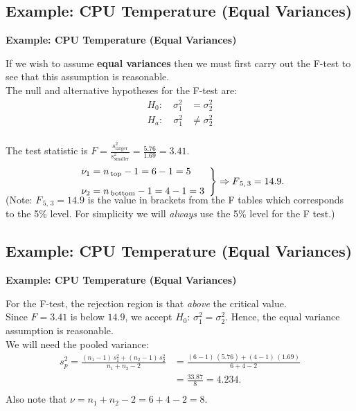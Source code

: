 \documentclass[compress]{beamer}        %
\makeatletter
\newcommand{\tcb}{\textcolor{beamer@blendedblue}}
\makeatother
\begin{document}
\subsection{Example: CPU Temperature (Equal Variances)}
\begin{frame}{\bf \tcb{Example: CPU Temperature (Equal Variances)}}

If we wish to assume {\bf equal variances} then we must first carry out the F-test to see that this assumption is reasonable.\\[0.4cm]

The null and alternative hypotheses for the F-test are:
\begin{align*}
H_0:\quad \sigma_1^2 &= \sigma_2^2 \\[0.2cm]
H_a:\quad \sigma_1^2 &\ne \sigma_2^2 \\[-0.4cm]
\end{align*}

The test statistic is $F = \frac{s_{\text{larger}}^2}{s_{\text{smaller}}^2} = \frac{5.76}{1.69} = 3.41$.\\[-0.1cm]
\begin{align*}\left.
\begin{array}{l}
\nu_1 = n_{\text{\,top}}-1 = 6-1=5 \\[0.3cm]
\nu_2 = n_{\text{\,bottom}}-1 = 4-1=3
\end{array}\right\} \Rightarrow F_{\,5,\,3}=14.9.\\[-0.4cm]
\end{align*}
{\footnotesize(Note: $F_{\,5,\,3}=14.9$ is the value in brackets from the F tables which corresponds to the 5\% level. For simplicity we will \emph{always} use the 5\% level for the F test.)}

\end{frame}




\subsection{Example: CPU Temperature (Equal Variances)}
\begin{frame}{\bf \tcb{Example: CPU Temperature (Equal Variances)}}

For the F-test, the rejection region is that \emph{above} the critical value.\\[0.4cm]

Since $F=3.41$ is below $14.9$, we accept $H_0:\, \sigma_1^2 = \sigma_2^2$. Hence, the equal variance assumption is reasonable.\\[0.8cm]

We will need the pooled variance:\\[-0.2cm]
\begin{align*}
s_p^2 = \frac{(n_1-1)\,s_1^2+(n_2-1)\,s_2^2}{n_1+n_2-2} &= \frac{(6-1)\,(5.76)+(4-1)\,(1.69)}{6+4-2} \\
&= \frac{33.87}{8} = 4.234.\\[-0.3cm]
\end{align*}
Also note that $\nu = n_1+n_2-2 = 6+4-2=8$.

\end{frame}
\end{document}
